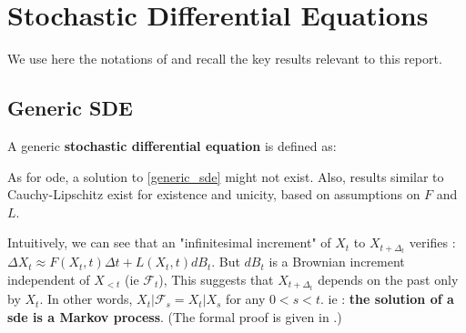 \chapter{Stochastic Differential Equations}\label{sec:SDE_results}

We use here the notations of \cite{sarkka_applied_2019} and recall the key results relevant to this report.

\section{Generic SDE}

A generic \textbf{stochastic differential equation} is defined as:


As for \gls{ode}, a solution to \ref{generic_sde} might not exist. Also, results similar to Cauchy-Lipschitz 
exist for existence and unicity, based on assumptions on $F$ and $L$. 

Intuitively, we can see that an "infinitesimal increment" of $X_t$ to $X_{t+\Delta_t}$ verifies :
$\Delta {X_t} \approx F(X_t, t) \Delta t + L(X_t,t) dB_t$. But $dB_t$ is a Brownian increment independent of $X_{<t}$ (ie $\mathcal{F}_t$),
This suggests that $X_{t+ \Delta_t}$ depends on the past only by $X_t$. In other words, $X_t \vert \mathcal{F}_s = X_t \vert X_s$ 
for any $0 < s < t$. ie : \textbf{the solution of a \gls{sde} is a Markov process}. (The formal proof is given in \cite{mouvement-brownien-calcul-ito}.)

